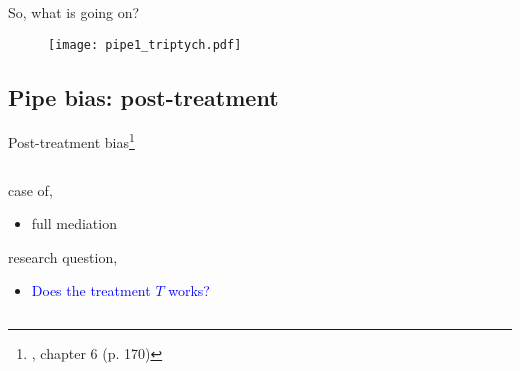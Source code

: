 %
%
\begin{frame}
	{So, what is going on?}
	
	\begin{figure*}
		\texttt{[image: pipe1\_triptych.pdf]}
	\end{figure*}
\end{frame}
%
%
\subsection{Pipe bias: post-treatment}
%
%
\begin{frame}[t, negative]
	\subsectionpage
\end{frame}
%
%
\begin{frame}
	{Post-treatment bias\footnote{\citet{McElreath_2020}, chapter 6 (p. 170)}}
	\begin{columns}
		\begin{column}{0.5\textwidth}
			case of,
			\begin{itemize}
				\item full mediation
			\end{itemize}
		
			research question, 
			\begin{itemize}
				\item \textcolor{blue}{Does the treatment $T$ works?}
			\end{itemize}
			

\end{column}
\end{columns}
\end{frame}
